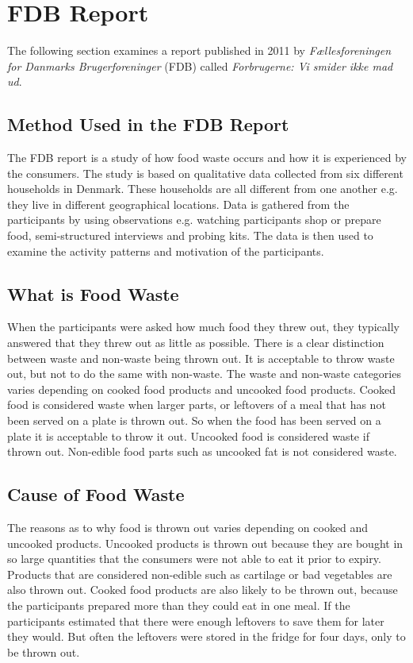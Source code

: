 \section{FDB Report}
The following section examines a report published in 2011 by \textit{Fællesforeningen for Danmarks Brugerforeninger} (FDB) called \textit{Forbrugerne: Vi smider ikke mad ud}\cite{madSpild_FDB}.

\subsection{Method Used in the FDB Report}
The FDB report is a study of how food waste occurs and how it is experienced by the consumers. The study is based on qualitative data collected from six different households in Denmark. These households are all different from one another e.g. they live in different geographical locations. Data is gathered from the participants by using observations e.g. watching participants shop or prepare food, semi-structured interviews and probing kits. The data is then used to examine the activity patterns and motivation of the participants.

\subsection{What is Food Waste}
When the participants were asked how much food they threw out, they typically answered that they threw out as little as possible. There is a clear distinction between waste and non-waste being thrown out. It is acceptable to throw waste out, but not to do the same with non-waste. The waste and non-waste categories varies depending on cooked food products and uncooked food products. Cooked food is considered waste when larger parts, or leftovers of a meal that has not been served on a plate is thrown out. So when the food has been served on a plate it is acceptable to throw it out. Uncooked food is considered waste if thrown out. Non-edible food parts such as uncooked fat is not considered waste.

\subsection{Cause of Food Waste} 
The reasons as to why food is thrown out varies depending on cooked and uncooked products. Uncooked products is thrown out because they are bought in so large quantities that the consumers were not able to eat it prior to expiry. Products that are considered non-edible such as cartilage or bad vegetables are also thrown out. Cooked food products are also likely to be thrown out, because the participants prepared more than they could eat in one meal. If the participants estimated that there were enough leftovers to save them for later they would. But often the leftovers were stored in the fridge for four days, only to be thrown out.

